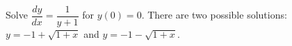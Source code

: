 {Solve $\dfrac{dy}{dx} = \dfrac{1}{y+1}$ for $y(0)=0$.}
{There are two possible solutions: $y=-1+\sqrt{1+x}$ and $y=-1-\sqrt{1+x}$.}